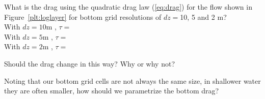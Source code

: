 \begin{question}
What is the drag using the quadratic drag law  (\ref{eq:drag}) for the
flow shown in Figure~\ref{plt:loglayer} for bottom grid resolutions of
$dz = $10, 5 and 2 m?\\
With $dz=10$m , $\tau  = $\\[24pt]
With $dz=5$m , $\tau  = $\\[24pt]
With $dz=2$m , $\tau  = $\\[12pt]
\end{question}

\begin{question}
Should the drag change in this way? Why or why not?
\end{question}

\vspace{1in}

\begin{question}
Noting that our bottom grid cells are not always the same size, in
shallower water they are often smaller, how should we parametrize the
bottom drag?\\[24pt]
\end{question}